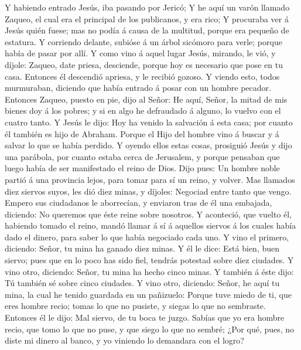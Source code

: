 Y habiendo entrado Jesús, iba pasando por Jericó;
 Y he aquí un varón llamado Zaqueo, el cual era el principal
de los publicanos, y era rico;  Y procuraba ver á Jesús
quién fuese; mas no podía á causa de la multitud, porque era pequeño de
estatura.  Y corriendo delante, subióse á un árbol sicómoro
para verle; porque había de pasar por allí.  Y como vino á
aquel lugar Jesús, mirando, le vió, y díjole: Zaqueo, date priesa,
desciende, porque hoy es necesario que pose en tu casa. 
Entonces él descendió apriesa, y le recibió gozoso.  Y
viendo esto, todos murmuraban, diciendo que había entrado á posar con un
hombre pecador.  Entonces Zaqueo, puesto en pie, dijo al
Señor: He aquí, Señor, la mitad de mis bienes doy á los pobres; y si en
algo he defraudado á alguno, lo vuelvo con el cuatro tanto. 
Y Jesús le dijo: Hoy ha venido la salvación á esta casa; por cuanto él
también es hijo de Abraham.  Porque el Hijo del hombre vino
á buscar y á salvar lo que se había perdido.  Y oyendo
ellos estas cosas, prosiguió Jesús y dijo una parábola, por cuanto
estaba cerca de Jerusalem, y porque pensaban que luego había de ser
manifestado el reino de Dios.  Dijo pues: Un hombre noble
partió á una provincia lejos, para tomar para sí un reino, y volver.
 Mas llamados diez siervos suyos, les dió diez minas, y
díjoles: Negociad entre tanto que vengo.  Empero sus
ciudadanos le aborrecían, y enviaron tras de él una embajada, diciendo:
No queremos que éste reine sobre nosotros.  Y aconteció,
que vuelto él, habiendo tomado el reino, mandó llamar á sí á aquellos
siervos á los cuales había dado el dinero, para saber lo que había
negociado cada uno.  Y vino el primero, diciendo: Señor, tu
mina ha ganado diez minas.  Y él le dice: Está bien, buen
siervo; pues que en lo poco has sido fiel, tendrás potestad sobre diez
ciudades.  Y vino otro, diciendo: Señor, tu mina ha hecho
cinco minas.  Y también á éste dijo: Tú también sé sobre
cinco ciudades.  Y vino otro, diciendo: Señor, he aquí tu
mina, la cual he tenido guardada en un pañizuelo:  Porque
tuve miedo de ti, que eres hombre recio; tomas lo que no pusiste, y
siegas lo que no sembraste.  Entonces él le dijo: Mal
siervo, de tu boca te juzgo. Sabías que yo era hombre recio, que tomo lo
que no puse, y que siego lo que no sembré;  ¿Por qué, pues,
no diste mi dinero al banco, y yo viniendo lo demandara con el logro?
